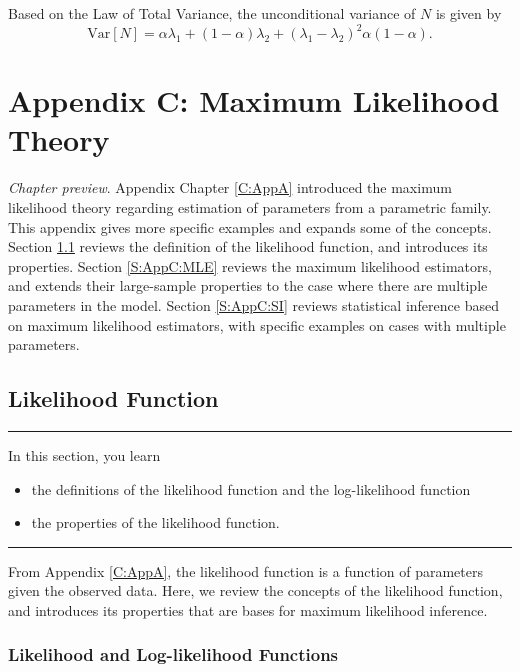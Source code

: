 \documentclass[]{book}
\providecommand{\tightlist}{%
  \setlength{\itemsep}{0pt}\setlength{\parskip}{0pt}}
\theoremstyle{definition}
\theoremstyle{definition}
\theoremstyle{definition}
\theoremstyle{remark}
\begin{document}
Based on the Law of Total Variance, the unconditional variance of \(N\)
is given by
\[\mathrm{Var}[N]= \alpha \lambda_1+ (1-\alpha) \lambda_2 + (\lambda_1-\lambda_2)^2 \alpha (1-\alpha).\]

\chapter{Appendix C: Maximum Likelihood Theory}\label{C:AppC}

\emph{Chapter preview}. Appendix Chapter \ref{C:AppA} introduced the
maximum likelihood theory regarding estimation of parameters from a
parametric family. This appendix gives more specific examples and
expands some of the concepts. Section \ref{S:AppC:LF} reviews the
definition of the likelihood function, and introduces its properties.
Section \ref{S:AppC:MLE} reviews the maximum likelihood estimators, and
extends their large-sample properties to the case where there are
multiple parameters in the model. Section \ref{S:AppC:SI} reviews
statistical inference based on maximum likelihood estimators, with
specific examples on cases with multiple parameters.

\section{Likelihood Function}\label{S:AppC:LF}

\begin{center}\rule{0.5\linewidth}{\linethickness}\end{center}

In this section, you learn

\begin{itemize}
\tightlist
\item
  the definitions of the likelihood function and the log-likelihood
  function
\item
  the properties of the likelihood function.
\end{itemize}

\begin{center}\rule{0.5\linewidth}{\linethickness}\end{center}

From Appendix \ref{C:AppA}, the likelihood function is a function of
parameters given the observed data. Here, we review the concepts of the
likelihood function, and introduces its properties that are bases for
maximum likelihood inference.

\subsection{Likelihood and Log-likelihood
Functions}\label{likelihood-and-log-likelihood-functions}
\end{document}

